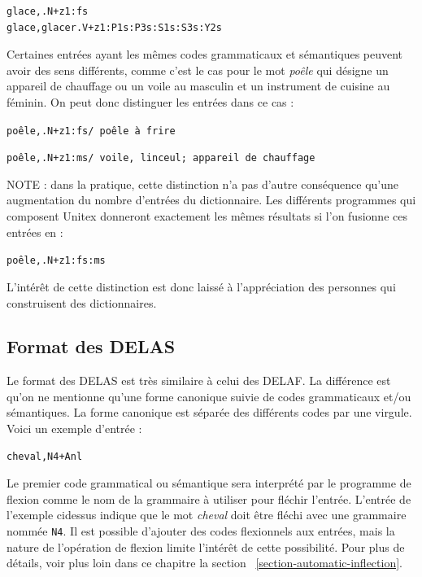 \bigskip
\begin{verbatim}
glace,.N+z1:fs
glace,glacer.V+z1:P1s:P3s:S1s:S3s:Y2s
\end{verbatim}

\bigskip 
\noindent Certaines entrées ayant les mêmes codes grammaticaux et sémantiques peuvent avoir
des sens différents, comme c’est le cas pour le mot \textit{poêle} qui désigne un appareil de
chauffage ou un voile au masculin et un instrument de cuisine au féminin. On peut donc distinguer
les entrées dans ce cas :


\bigskip
\noindent
\texttt{poêle,.N+z1:fs/ poêle à frire}

\noindent
\texttt{poêle,.N+z1:ms/ voile, linceul; appareil de chauffage}

\bigskip 
\noindent NOTE : dans la pratique, cette distinction n’a pas d’autre conséquence qu’une
augmentation du nombre d’entrées du dictionnaire. Les différents programmes qui composent Unitex
donneront exactement les mêmes résultats si l’on fusionne ces entrées en :

\bigskip
\noindent
\texttt{poêle,.N+z1:fs:ms}

\bigskip 
\noindent L’intérêt de cette distinction est donc laissé à l’appréciation des personnes qui
construisent des dictionnaires.



\subsection{Format des DELAS}
\label{section-DELAS-format}

Le format des DELAS est très similaire à celui des DELAF. La différence est qu’on ne
mentionne qu’une forme canonique suivie de codes grammaticaux et/ou sémantiques. La
forme canonique est séparée des différents codes par une virgule. Voici un exemple d’entrée :


\begin{verbatim}
cheval,N4+Anl
\end{verbatim}

\noindent Le premier code grammatical ou sémantique sera interprété par le programme de flexion
comme le nom de la grammaire à utiliser pour fléchir l’entrée. L’entrée de l’exemple cidessus
indique que le mot \textit{cheval} doit être fléchi avec une grammaire nommée \verb+N4+.
Il est possible d’ajouter des codes flexionnels aux entrées, mais la nature de l’opération de
flexion limite l’intérêt de cette possibilité. Pour plus de détails, voir plus loin dans ce chapitre
la section ~\ref{section-automatic-inflection}.


